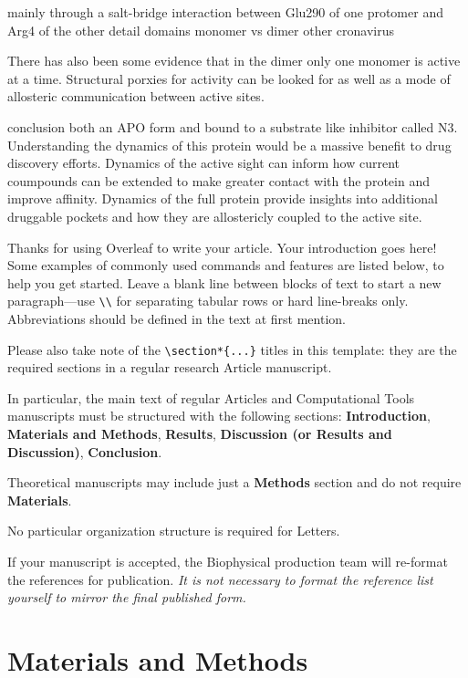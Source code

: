 \documentclass{biophys-new}
\begin{document}
 mainly through a salt-bridge interaction between Glu290 of one protomer and
Arg4 of the other
detail domains
monomer vs dimer
    other cronavirus

There has also been some evidence that in the dimer only one monomer is active at a time. Structural porxies for activity can be looked for as well as a mode of allosteric communication between active sites.


conclusion
both an APO form and bound to a substrate like inhibitor called N3. Understanding the dynamics of this protein would be a massive benefit to drug discovery efforts. Dynamics of the active sight can inform how current coumpounds can be extended to make greater contact with the protein and improve affinity. Dynamics of the full protein provide insights into additional druggable pockets and how they are allostericly coupled to the active site.


Thanks for using Overleaf to write your article. Your introduction goes here! Some examples of commonly used commands and features are listed below, to help you get started. Leave a blank line between blocks of text to start a new paragraph---use \verb|\\| for separating tabular rows or hard line-breaks only. Abbreviations should be defined in the text at first mention.

Please also take note of the \verb|\section*{...}| titles in this template: they are the required sections in a regular research Article manuscript. 

In particular, the main text of regular Articles and Computational Tools manuscripts must be structured with the following sections: \textbf{Introduction}, \textbf{Materials and Methods}, \textbf{Results}, \textbf{Discussion (or Results and Discussion)}, \textbf{Conclusion}.

Theoretical manuscripts may include just a \textbf{Methods} section and do not require \textbf{Materials}.

No particular organization structure is required for Letters.

If your manuscript is accepted, the Biophysical production team will re-format the references for publication. \emph{It is not necessary to format the reference list yourself to mirror the final published form.}

\section*{Materials and Methods}
\end{document}
